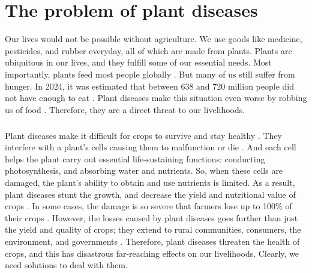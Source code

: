 \section{The problem of plant diseases}
Our lives would not be possible without agriculture. We use goods like medicine, pesticides, and rubber everyday, all of which are made from plants. Plants are ubiquitous in our lives, and they fulfill some of our essential needs. Most importantly, plants feed most people globally \cite{mccouchFeedingFuture2013}. But many of us still suffer from hunger. In 2024, it was estimated that between 638 and 720 million people did not have enough to eat \cite{StateFoodSecurity2025}. Plant diseases make this situation even worse by robbing us of food \cite{carvajal-yepesGlobalSurveillanceSystem2019, heHighThroughputRoboticPhenotyping2025, nazarovInfectiousPlantDiseases2020, hughesOpenAccessRepository2016}. Therefore, they are a direct threat to our livelihoods.
\subparagraph{}
Plant diseases make it difficult for crops to survive and stay healthy \cite{agriosINTRODUCTION2005}. They interfere with a plant's cells causing them to malfunction or die \cite{huberRelationshipNutritionPlant2012}. And each cell helps the plant carry out essential life-sustaining functions: conducting photosynthesis, and absorbing water and nutrients. So, when these cells are damaged, the plant's ability to obtain and use nutrients is limited. As a result, plant diseases stunt the growth, and decrease the yield and nutritional value of crops \cite{savaryCropLossesDue2012, vyskaTradeoffDiseaseResistance2016, chinPlantDiseaseDetection2023, kitpoEarlyRiceDisease2018, martinelliAdvancedMethodsPlant2015}. In some cases, the damage is so severe that farmers lose up to 100\% of their crops \cite{nazarovInfectiousPlantDiseases2020, dongPlantPADPlatformLargescale2024}. However, the losses caused by plant diseases goes further than just the yield and quality of crops; they extend to rural communities, consumers, the environment, and governments \cite{savaryCropLossesDue2012}. Therefore, plant diseases threaten the health of crops, and this has disastrous far-reaching effects on our livelihoods. Clearly, we need solutions to deal with them.

